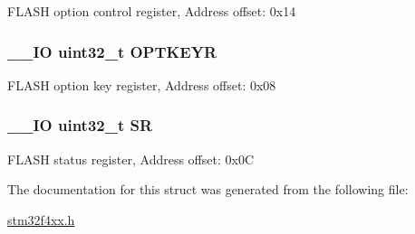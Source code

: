 F\-L\-A\-S\-H option control register, Address offset\-: 0x14 \hypertarget{struct_f_l_a_s_h___type_def_afc4900646681dfe1ca43133d376c4423}{
\subsubsection[{O\-P\-T\-K\-E\-Y\-R}]{\setlength{\rightskip}{0pt plus 5cm}\-\_\-\-\_\-\-I\-O uint32\-\_\-t O\-P\-T\-K\-E\-Y\-R}}\label{struct_f_l_a_s_h___type_def_afc4900646681dfe1ca43133d376c4423}
F\-L\-A\-S\-H option key register, Address offset\-: 0x08 \hypertarget{struct_f_l_a_s_h___type_def_af6aca2bbd40c0fb6df7c3aebe224a360}{
\subsubsection[{S\-R}]{\setlength{\rightskip}{0pt plus 5cm}\-\_\-\-\_\-\-I\-O uint32\-\_\-t S\-R}}\label{struct_f_l_a_s_h___type_def_af6aca2bbd40c0fb6df7c3aebe224a360}
F\-L\-A\-S\-H status register, Address offset\-: 0x0\-C 

The documentation for this struct was generated from the following file\-:\begin{DoxyCompactItemize}
\item 
\hyperlink{stm32f4xx_8h}{stm32f4xx.\-h}\end{DoxyCompactItemize}
